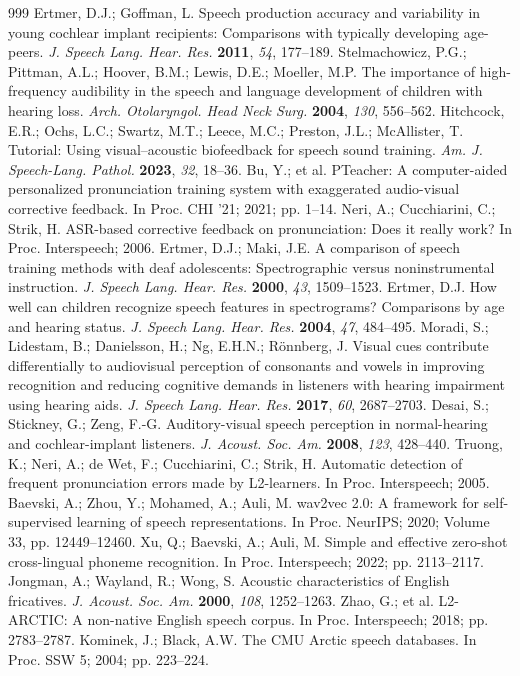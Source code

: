 \documentclass[engproc,article,submit,moreauthors]{Definitions/mdpi}
\begin{document}
\begin{thebibliography}{999}
 Ertmer, D.J.; Goffman, L. Speech production accuracy and variability in young cochlear implant recipients: Comparisons with typically developing age-peers. {\em J. Speech Lang. Hear. Res.} {\bf 2011}, {\em 54}, 177--189.
 Stelmachowicz, P.G.; Pittman, A.L.; Hoover, B.M.; Lewis, D.E.; Moeller, M.P. The importance of high-frequency audibility in the speech and language development of children with hearing loss. {\em Arch. Otolaryngol. Head Neck Surg.} {\bf 2004}, {\em 130}, 556--562.
 Hitchcock, E.R.; Ochs, L.C.; Swartz, M.T.; Leece, M.C.; Preston, J.L.; McAllister, T. Tutorial: Using visual--acoustic biofeedback for speech sound training. {\em Am. J. Speech-Lang. Pathol.} {\bf 2023}, {\em 32}, 18--36.
 Bu, Y.; et al. PTeacher: A computer-aided personalized pronunciation training system with exaggerated audio-visual corrective feedback. In Proc. CHI '21; 2021; pp. 1--14.
 Neri, A.; Cucchiarini, C.; Strik, H. ASR-based corrective feedback on pronunciation: Does it really work? In Proc. Interspeech; 2006.
 Ertmer, D.J.; Maki, J.E. A comparison of speech training methods with deaf adolescents: Spectrographic versus noninstrumental instruction. {\em J. Speech Lang. Hear. Res.} {\bf 2000}, {\em 43}, 1509--1523.
 Ertmer, D.J. How well can children recognize speech features in spectrograms? Comparisons by age and hearing status. {\em J. Speech Lang. Hear. Res.} {\bf 2004}, {\em 47}, 484--495.
 Moradi, S.; Lidestam, B.; Danielsson, H.; Ng, E.H.N.; R{\"o}nnberg, J. Visual cues contribute differentially to audiovisual perception of consonants and vowels in improving recognition and reducing cognitive demands in listeners with hearing impairment using hearing aids. {\em J. Speech Lang. Hear. Res.} {\bf 2017}, {\em 60}, 2687--2703.
 Desai, S.; Stickney, G.; Zeng, F.-G. Auditory-visual speech perception in normal-hearing and cochlear-implant listeners. {\em J. Acoust. Soc. Am.} {\bf 2008}, {\em 123}, 428--440.
 Truong, K.; Neri, A.; de Wet, F.; Cucchiarini, C.; Strik, H. Automatic detection of frequent pronunciation errors made by L2-learners. In Proc. Interspeech; 2005.
 Baevski, A.; Zhou, Y.; Mohamed, A.; Auli, M. wav2vec 2.0: A framework for self-supervised learning of speech representations. In Proc. NeurIPS; 2020; Volume 33, pp. 12449--12460.
 Xu, Q.; Baevski, A.; Auli, M. Simple and effective zero-shot cross-lingual phoneme recognition. In Proc. Interspeech; 2022; pp. 2113--2117.
 Jongman, A.; Wayland, R.; Wong, S. Acoustic characteristics of English fricatives. {\em J. Acoust. Soc. Am.} {\bf 2000}, {\em 108}, 1252--1263.
 Zhao, G.; et al. L2-ARCTIC: A non-native English speech corpus. In Proc. Interspeech; 2018; pp. 2783--2787.
 Kominek, J.; Black, A.W. The CMU Arctic speech databases. In Proc. SSW 5; 2004; pp. 223--224.
\end{thebibliography}
\end{document}
